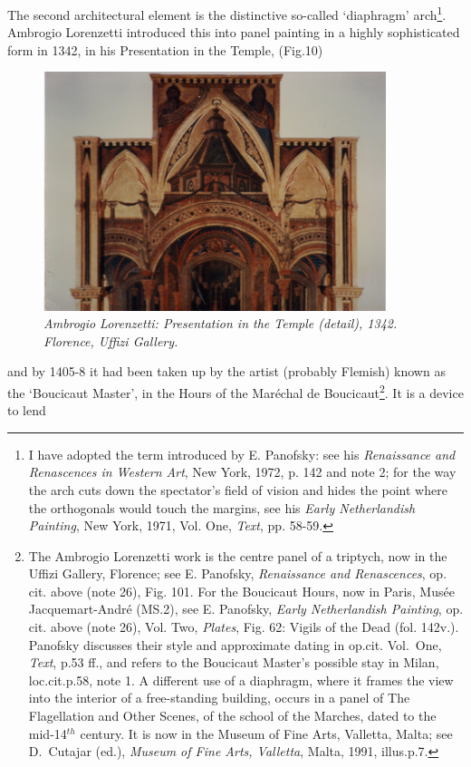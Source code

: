 \documentclass[a4paper,12pt]{article}
\begin{document}
The second architectural element is the distinctive so-called
`diaphragm' arch\footnote{I have adopted the term introduced by
E. Panofsky: see his \textit{Renaissance and Renascences in Western
Art}, New York, 1972, p. 142 and note 2; for the way the arch cuts
down the spectator's field of vision and hides the point where the
orthogonals would touch the margins, see his \textit{Early
Netherlandish Painting}, New York, 1971, Vol. One, \textit{Text},
pp. 58-59.}. Ambrogio Lorenzetti introduced this into panel painting
in a highly sophisticated form in 1342, in his Presentation in the
Temple, (Fig.10)
\begin{figure}[htbp]
\centering
\includegraphics[width=10cm]{pics/fig10.png}
\caption[Ambrogio Lorenzetti: Presentation in the Temple (detail)]
{\it Ambrogio Lorenzetti: Presentation in the Temple (detail), 1342.
Florence, Uffizi Gallery.} 
\end{figure}
and by 1405-8 it had been taken up by the artist
(probably Flemish) known as the `Boucicaut Master', in the Hours of
the Mar\'echal de Boucicaut\footnote{The Ambrogio Lorenzetti work is the
centre panel of a triptych, now in the Uffizi Gallery, Florence; see
E. Panofsky, \textit{Renaissance and Renascences}, op. cit. above
(note 26), Fig. 101.  For the Boucicaut Hours, now in Paris, Mus\'ee
Jacquemart-Andr\'e (MS.2), see E. Panofsky, \textit{Early Netherlandish
Painting}, op. cit. above (note 26), Vol. Two, \textit{Plates},
Fig. 62: Vigils of the Dead (fol. 142v.). Panofsky discusses their
style and approximate dating in op.cit. Vol.~One, \textit{Text}, p.53
ff., and refers to the Boucicaut Master's possible stay in Milan,
loc.cit.p.58, note 1. A different use of a diaphragm, where it frames
the view into the interior of a free-standing building, occurs in a
panel of The Flagellation and Other Scenes, of the school of the
Marches, dated to the mid-14$^{th}$ century. It is now in the Museum
of Fine Arts, Valletta, Malta; see D.~Cutajar (ed.), \textit{Museum of
Fine Arts, Valletta}, Malta, 1991, illus.p.7.}. It is a device to lend
\end{document}

